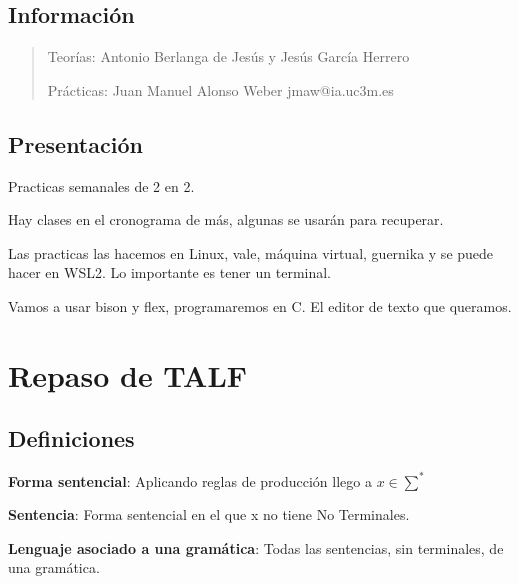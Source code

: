 \documentclass[12pt]{report} %
\begin{document}
\listoffigures
\thispagestyle{fancy}

\listoftables
\thispagestyle{fancy}

\clearpage
{} %



\section{Información}

\begin{quote}
Teorías: Antonio Berlanga de Jesús y Jesús García Herrero

Prácticas: Juan Manuel Alonso Weber jmaw@ia.uc3m.es
\end{quote}

\section{Presentación}

Practicas semanales de 2 en 2.

Hay clases en el cronograma de más, algunas se usarán para recuperar.

Las practicas las hacemos en Linux, vale, máquina virtual, guernika y se
puede hacer en WSL2. Lo importante es tener un terminal.

Vamos a usar bison y flex, programaremos en C. El editor de texto que
queramos.

\chapter{Repaso de TALF}

\section{Definiciones}

\textbf{Forma sentencial}: Aplicando reglas de producción llego a
\(x \in \sum^*\)

\textbf{Sentencia}: Forma sentencial en el que x no tiene No Terminales.

\textbf{Lenguaje asociado a una gramática}: Todas las sentencias, sin
terminales, de una gramática.
\end{document}
